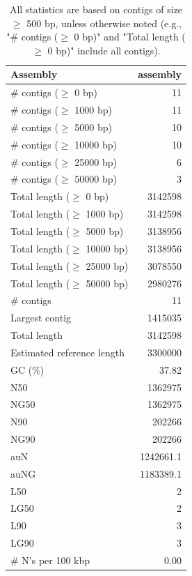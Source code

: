 \documentclass[12pt,a4paper]{article}
\begin{document}
\begin{table}[ht]
\begin{center}
\caption{All statistics are based on contigs of size $\geq$ 500 bp, unless otherwise noted (e.g., "\# contigs ($\geq$ 0 bp)" and "Total length ($\geq$ 0 bp)" include all contigs).}
\begin{tabular}{|l*{1}{|r}|}
\hline
Assembly & assembly \\ \hline
\# contigs ($\geq$ 0 bp) & 11 \\ \hline
\# contigs ($\geq$ 1000 bp) & 11 \\ \hline
\# contigs ($\geq$ 5000 bp) & 10 \\ \hline
\# contigs ($\geq$ 10000 bp) & 10 \\ \hline
\# contigs ($\geq$ 25000 bp) & 6 \\ \hline
\# contigs ($\geq$ 50000 bp) & 3 \\ \hline
Total length ($\geq$ 0 bp) & 3142598 \\ \hline
Total length ($\geq$ 1000 bp) & 3142598 \\ \hline
Total length ($\geq$ 5000 bp) & 3138956 \\ \hline
Total length ($\geq$ 10000 bp) & 3138956 \\ \hline
Total length ($\geq$ 25000 bp) & 3078550 \\ \hline
Total length ($\geq$ 50000 bp) & 2980276 \\ \hline
\# contigs & 11 \\ \hline
Largest contig & 1415035 \\ \hline
Total length & 3142598 \\ \hline
Estimated reference length & 3300000 \\ \hline
GC (\%) & 37.82 \\ \hline
N50 & 1362975 \\ \hline
NG50 & 1362975 \\ \hline
N90 & 202266 \\ \hline
NG90 & 202266 \\ \hline
auN & 1242661.1 \\ \hline
auNG & 1183389.1 \\ \hline
L50 & 2 \\ \hline
LG50 & 2 \\ \hline
L90 & 3 \\ \hline
LG90 & 3 \\ \hline
\# N's per 100 kbp & 0.00 \\ \hline
\end{tabular}
\end{center}
\end{table}
\end{document}
